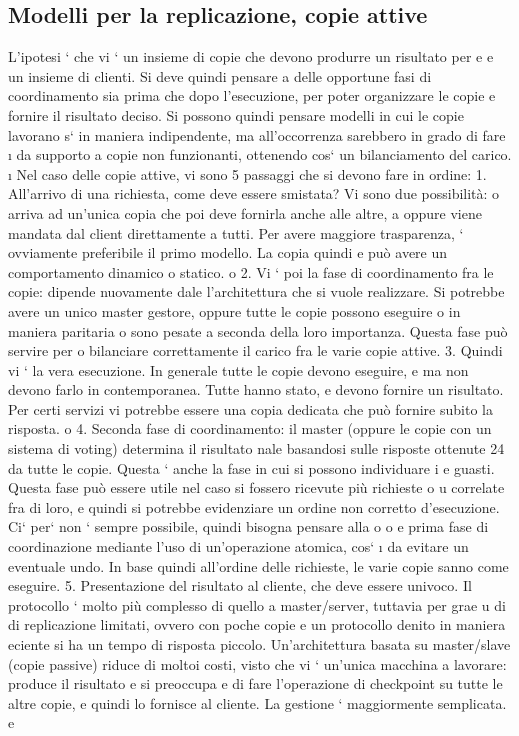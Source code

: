\documentclass[a4paper,12pt]{article}
\begin{document}
\subsection{Modelli per la replicazione, copie attive}
L'ipotesi ` che vi ` un insieme di copie che devono produrre un risultato per
e
e
un insieme di clienti. Si deve quindi pensare a delle opportune fasi di coordinamento sia prima che dopo l'esecuzione,
per poter organizzare le copie e
fornire il risultato deciso. Si possono quindi pensare modelli in cui le copie lavorano s` in maniera indipendente, ma
all'occorrenza sarebbero in grado di fare
\i{}
da supporto a copie non funzionanti, ottenendo cos` un bilanciamento del carico.
\i{}
Nel caso delle copie attive, vi sono 5 passaggi che si devono fare in ordine:
1. All'arrivo di una richiesta, come deve essere smistata? Vi sono due possibilità: o arriva ad un'unica copia che poi
deve fornirla anche alle altre,
a
oppure viene mandata dal client direttamente a tutti. Per avere maggiore
trasparenza, ` ovviamente preferibile il primo modello. La copia quindi
e
può avere un comportamento dinamico o statico.
o
2. Vi ` poi la fase di coordinamento fra le copie: dipende nuovamente dale
l'architettura che si vuole realizzare. Si potrebbe avere un unico master
gestore, oppure tutte le copie possono eseguire o in maniera paritaria o
sono pesate a seconda della loro importanza. Questa fase può servire per
o
bilanciare correttamente il carico fra le varie copie attive.
3. Quindi vi ` la vera esecuzione. In generale tutte le copie devono eseguire,
e
ma non devono farlo in contemporanea. Tutte hanno stato, e devono
fornire un risultato. Per certi servizi vi potrebbe essere una copia dedicata
che può fornire subito la risposta.
o
4. Seconda fase di coordinamento: il master (oppure le copie con un sistema
di voting) determina il risultato nale basandosi sulle risposte ottenute
24
da tutte le copie. Questa ` anche la fase in cui si possono individuare i
e
guasti. Questa fase può essere utile nel caso si fossero ricevute più richieste
o
u
correlate fra di loro, e quindi si potrebbe evidenziare un ordine non corretto
d'esecuzione. Ci` per` non ` sempre possibile, quindi bisogna pensare alla
o
o
e
prima fase di coordinazione mediante l'uso di un'operazione atomica, cos`
\i{}
da evitare un eventuale undo. In base quindi all'ordine delle richieste, le
varie copie sanno come eseguire.
5. Presentazione del risultato al cliente, che deve essere univoco.
Il protocollo ` molto più complesso di quello a master/server, tuttavia per grae
u
di di replicazione limitati, ovvero con poche copie e un protocollo denito in
maniera eciente si ha un tempo di risposta piccolo.
Un'architettura basata su master/slave (copie passive) riduce di moltoi costi,
visto che vi ` un'unica macchina a lavorare: produce il risultato e si preoccupa
e
di fare l'operazione di checkpoint su tutte le altre copie, e quindi lo fornisce al
cliente. La gestione ` maggiormente semplicata.
e
\end{document}
